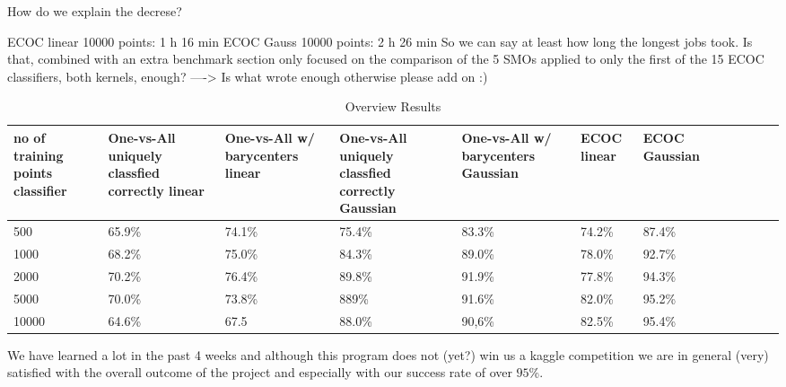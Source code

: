 How do we explain the decrese?
 
ECOC linear 10000 points: 1 h 16 min
ECOC Gauss 10000 points: 2 h 26 min
So we can say at least how long the longest jobs took. Is that, combined with an extra benchmark section only focused on the comparison of the 5 SMOs applied to only the first of the  15 ECOC classifiers, both kernels, enough? 
----> Is what wrote enough otherwise please add on :) 

\begin{table}[ht!]
	\centering
	\caption{Overview Results}
	\begin{tabular}{|l|l|l|l|l|l|l|l|l|l|l|l|} \hline
\multicolumn{1}{|p{2cm}|}{no of training points classifier} & \multicolumn{1}{p{2cm}|}{One-vs-All uniquely classfied correctly linear} & \multicolumn{1}{p{2cm}|}{One-vs-All w/ barycenters linear} & \multicolumn{1}{p{2cm}|}{One-vs-All uniquely classfied correctly Gaussian} &  \multicolumn{1}{p{2cm}|}{One-vs-All w/ barycenters Gaussian} & \multicolumn{1}{p{2cm}|}{ECOC linear} & \multicolumn{1}{p{2cm}|}{ECOC Gaussian} \\ \hline \hline
500	& 65.9\% & 74.1\% & 75.4\% & 83.3\% & 74.2\% & 87.4\% \\ \hline
1000	& 68.2\% & 75.0\% & 84.3\% & 89.0\% & 78.0\% & 92.7\% \\ \hline
2000	& 70.2\% & 76.4\% & 89.8\% & 91.9\% & 77.8\% & 94.3\% \\ \hline
5000	& 70.0\% & 73.8\% & 889\% & 91.6\% & 82.0\% & 95.2\% \\ \hline
10000	& 64.6\% & 67.5 & 88.0\% & 90,6\% & 82.5\% & 95.4\% \\ \hline
	\end{tabular}
\end{table}

We have learned a lot in the past 4 weeks and although this program does not (yet?) win us a kaggle competition we are in general (very) satisfied with the overall outcome of the project and especially with our success rate of over $95$\%.
